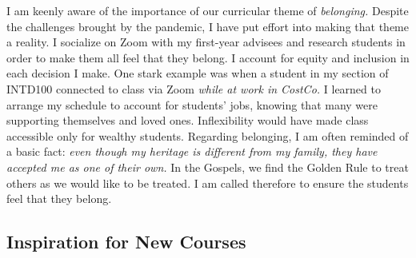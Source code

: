 \documentclass[../../main.tex]{subfiles}
\begin{document}
\vspace{0.15cm}
I am keenly aware of the importance of our curricular theme of \textit{belonging.}  Despite the challenges brought by the pandemic, I have put effort into making that theme a reality.  I socialize on Zoom with my first-year advisees and research students in order to make them all feel that they belong.  I account for equity and inclusion in each decision I make.  One stark example was when a student in my section of INTD100 connected to class via Zoom \textit{while at work in CostCo.}  I learned to arrange my schedule to account for students' jobs, knowing that many were supporting themselves and loved ones.  Inflexibility would have made class accessible only for wealthy students.  Regarding belonging, I am often reminded of a basic fact: \textit{even though my heritage is different from my family, they have accepted me as one of their own.}  In the Gospels, we find the Golden Rule to treat others as we would like to be treated.  I am called therefore to ensure the students feel that they belong.

\subsection{Inspiration for New Courses}
\end{document}
